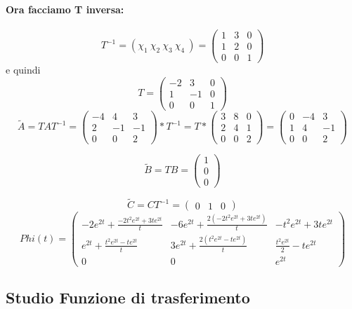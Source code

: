 \documentclass{article}
\begin{document}
\paragraph{Ora facciamo T inversa:} \[ T^{-1} = (\chi_1\ \chi_2\ \chi_3\ \chi_4\ ) = \left(\begin{matrix}1 & 3 & 0\\1 & 2 & 0\\0 & 0 & 1\end{matrix}\right) \]
e quindi \[T = \left(\begin{matrix}-2 & 3 & 0\\1 & -1 & 0\\0 & 0 & 1\end{matrix}\right)\]
\[ \widetilde{A} = TAT^{-1} = \left(\begin{matrix}-4 & 4 & 3\\2 & -1 & -1\\0 & 0 & 2\end{matrix}\right) * T^{-1} = T*\left(\begin{matrix}3 & 8 & 0\\2 & 4 & 1\\0 & 0 & 2\end{matrix}\right) =\left(\begin{matrix}0 & -4 & 3\\1 & 4 & -1\\0 & 0 & 2\end{matrix}\right) \]

\[ \widetilde{B} = T B = \left(\begin{matrix}1\\0\\0\end{matrix}\right) \]

\[ \widetilde{C} = C T^{-1} = \left(\begin{matrix}0 & 1 & 0\end{matrix}\right) \]
\[Phi(t) = \left(\begin{matrix}- 2 e^{2 t} + \frac{- 2 t^{2} e^{2 t} + 3 t e^{2 t}}{t} & - 6 e^{2 t} + \frac{2 \left(- 2 t^{2} e^{2 t} + 3 t e^{2 t}\right)}{t} & - t^{2} e^{2 t} + 3 t e^{2 t}\\e^{2 t} + \frac{t^{2} e^{2 t} - t e^{2 t}}{t} & 3 e^{2 t} + \frac{2 \left(t^{2} e^{2 t} - t e^{2 t}\right)}{t} & \frac{t^{2} e^{2 t}}{2} - t e^{2 t}\\0 & 0 & e^{2 t}\end{matrix}\right) \]

\subsection{Studio Funzione di trasferimento}
\end{document}
